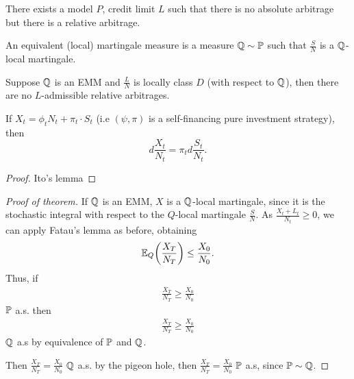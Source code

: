 \begin{remark}
  There exists a model $P$, credit limit $L$ such that there is no
  absolute arbitrage but there is a relative arbitrage. 
\end{remark}

\begin{defn}
  \label{defn:continuous_time:28}
  An equivalent (local) martingale measure is a measure $\Q \sim
  \Prob$ such that $\frac{S}{N}$ is a $\Q$-local martingale.
\end{defn}

\begin{thm}
  \label{defn:continuous_time:29}
  Suppose $\Q$ is an EMM and $\frac{L}{N}$ is locally class $D$ (with
  respect to $\Q$), then there are no $L$-admissible relative
  arbitrages.
\end{thm}

\begin{lem}
  If $X_{t}= \phi_{t} N_{t} + \pi_{t} \cdot S_{t}$ (i.e $(\psi, \pi)$
  is a self-financing pure investment strategy), then
  \begin{equation}
    \label{eq:71}
    d\frac{X_{t}}{N_{t}} = \pi_{t} d \frac{S_{t}}{N_{t}}.
  \end{equation}

\end{lem}

\begin{proof}
  Ito's lemma
\end{proof}

\begin{proof}[Proof of theorem]
  If $\Q$ is an EMM, $X$ is a $\Q$-local martingale, since it is the
  stochastic integral with respect to the $Q$-local martingale
  $\frac{S}{N}$.  As $\frac{X_{t} + L_{t}}{N_{t}} \geq 0$, we can
  apply Fatau's lemma as before, obtaining
  \begin{align}
    \label{eq:72}
    \E{\frac{X_{T}}{N_{T}}}{Q} \leq \frac{X_{0}}{N_{0}}.
  \end{align}  Thus, if
  \begin{align}
    \label{eq:73}
    \frac{X_{T}}{N_{T}} \geq \frac{X_{0}}{N_{0}}
  \end{align} $\Prob$ a.s.  then
  \begin{align}
    \label{eq:74}
    \frac{X_{T}}{N_{T}} \geq \frac{X_{0}}{N_{0}}
  \end{align} $\Q$ a.s by equivalence of $\Prob$ and $\Q$.

  Then $\frac{X_{T}}{N_{T}} = \frac{X_{0}}{N_{0}}$ $\Q$ a.s. by the
  pigeon hole, then $\frac{X_{T}}{N_{T}} = \frac{X_{0}}{N_{0}}$
  $\Prob$ a.s, since $\Prob \sim \Q$.
\end{proof}

